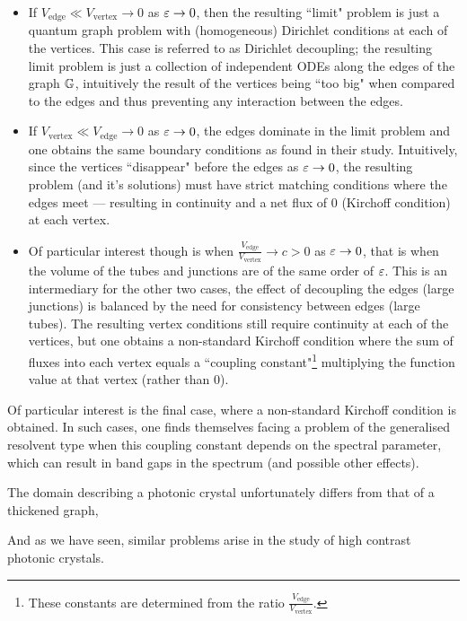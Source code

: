 \begin{itemize}
	\item If $V_{\mathrm{edge}}\ll V_{\mathrm{vertex}}\rightarrow0$ as $\varepsilon\rightarrow0$, then the resulting ``limit" problem is just a quantum graph problem with (homogeneous) Dirichlet conditions at each of the vertices.
	This case is referred to as Dirichlet decoupling; the resulting limit problem is just a collection of independent ODEs along the edges of the graph $\mathbb{G}$, intuitively the result of the vertices being ``too big" when compared to the edges and thus preventing any interaction between the edges.
	\item If $V_{\mathrm{vertex}}\ll V_{\mathrm{edge}}\rightarrow0$ as $\varepsilon\rightarrow0$, the edges dominate in the limit problem and one obtains the same boundary conditions as  found in their study.
	Intuitively, since the vertices ``disappear" before the edges as $\varepsilon\rightarrow0$, the resulting problem (and it's solutions) must have strict matching conditions where the edges meet --- resulting in continuity and a net flux of 0 (Kirchoff condition) at each vertex.
	\item Of particular interest though is when $\frac{V_{\mathrm{edge}}}{V_{\mathrm{vertex}}}\rightarrow c>0$ as $\varepsilon\rightarrow0$, that is when the volume of the tubes and junctions are of the same order of $\varepsilon$.
	This is an intermediary for the other two cases, the effect of decoupling the edges (large junctions) is balanced by the need for consistency between edges (large tubes).
	The resulting vertex conditions still require continuity at each of the vertices, but one obtains a non-standard Kirchoff condition where the sum of fluxes into each vertex equals a ``coupling constant"\footnote{These constants are determined from the ratio $\frac{V_{\mathrm{edge}}}{V_{\mathrm{vertex}}}$.} multiplying the function value at that vertex (rather than 0).
\end{itemize}
Of particular interest is the final case, where a non-standard Kirchoff condition is obtained.
In such cases, one finds themselves facing a problem of the generalised resolvent type when this coupling constant depends on the spectral parameter, which  can result in band gaps in the spectrum (and possible other effects).

The domain describing a photonic crystal unfortunately differs from that of a thickened graph, 

And as we have seen,   similar problems arise in the study of high contrast photonic crystals.
